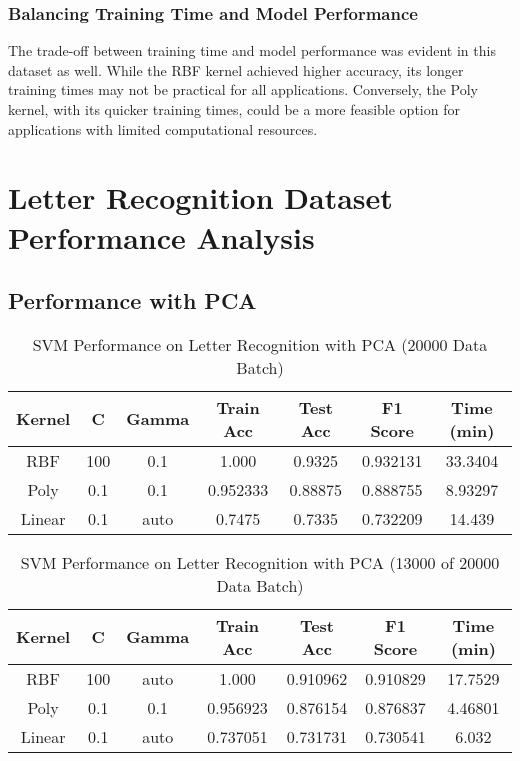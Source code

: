\documentclass[conference]{IEEEtran}
\begin{document}
\subsubsection{Balancing Training Time and Model Performance}
The trade-off between training time and model performance was evident in this dataset as well. While the RBF kernel achieved higher accuracy, its longer training times may not be practical for all applications. Conversely, the Poly kernel, with its quicker training times, could be a more feasible option for applications with limited computational resources.

\section{Letter Recognition Dataset Performance Analysis}

\subsection{Performance with PCA}

\begin{table}[H]
\centering
\caption{SVM Performance on Letter Recognition with PCA (20000 Data Batch)}

\begin{tabular}{|c|c|c|c|c|c|c|}
\hline
Kernel & C & Gamma & Train Acc & Test Acc & F1 Score & Time (min) \\ \hline
RBF & 100 & 0.1 & 1.000 & 0.9325 & 0.932131 & 33.3404 \\ \hline
Poly & 0.1 & 0.1 & 0.952333 & 0.88875 & 0.888755 & 8.93297 \\ \hline
Linear & 0.1 & auto & 0.7475 & 0.7335 & 0.732209 & 14.439 \\ \hline
\end{tabular}
\end{table}


\begin{table}[H]
\centering
\caption{SVM Performance on Letter Recognition with PCA (13000 of 20000 Data Batch)}

\begin{tabular}{|c|c|c|c|c|c|c|}
\hline
Kernel & C & Gamma & Train Acc & Test Acc & F1 Score & Time (min) \\ \hline
RBF & 100 & auto & 1.000 & 0.910962 & 0.910829 & 17.7529 \\ \hline
Poly & 0.1 & 0.1 & 0.956923 & 0.876154 & 0.876837 & 4.46801 \\ \hline
Linear & 0.1 & auto & 0.737051 & 0.731731 & 0.730541 & 6.032 \\ \hline
\end{tabular}
\end{table}
\end{document}
